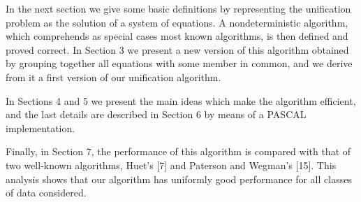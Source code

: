In the next section we give some basic definitions by representing the
unification problem as the solution of a system of equations. A nondeterministic
algorithm, which comprehends as special cases most known algorithms, is then
defined and proved correct. In Section 3 we present a new version of this
algorithm obtained by grouping together all equations with some member in
common, and we derive from it a first version of our unification algorithm.

In Sections 4 and 5 we present the main ideas which make the algorithm
efficient, and the last details are described in Section 6 by means of a PASCAL
implementation.

Finally, in Section 7, the performance of this algorithm is compared with that
of two well-known algorithms, Huet's [7] and Paterson and Wegman's [15]. This
analysis shows that our algorithm has uniformly good performance for all classes
of data considered.

